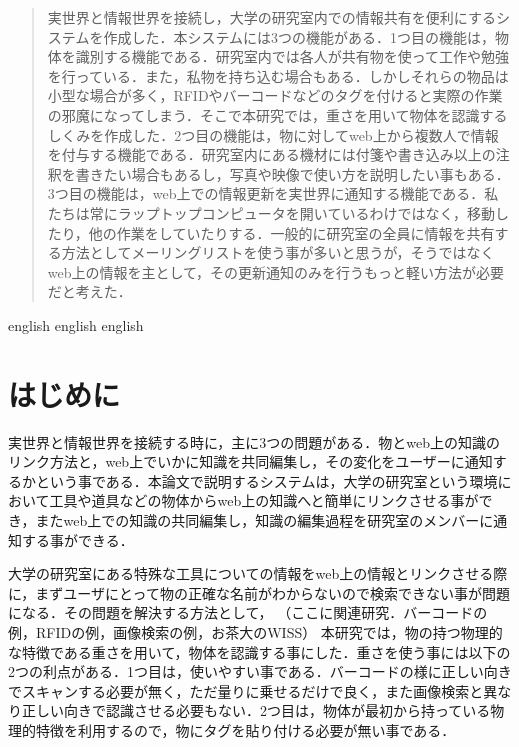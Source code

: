 
\begin{abstract}
実世界と情報世界を接続し，大学の研究室内での情報共有を便利にするシステムを作成した．本システムには3つの機能がある．1つ目の機能は，物体を識別する機能である．研究室内では各人が共有物を使って工作や勉強を行っている．また，私物を持ち込む場合もある．しかしそれらの物品は小型な場合が多く，RFIDやバーコードなどのタグを付けると実際の作業の邪魔になってしまう．そこで本研究では，重さを用いて物体を認識するしくみを作成した．2つ目の機能は，物に対してweb上から複数人で情報を付与する機能である．研究室内にある機材には付箋や書き込み以上の注釈を書きたい場合もあるし，写真や映像で使い方を説明したい事もある．3つ目の機能は，web上での情報更新を実世界に通知する機能である．私たちは常にラップトップコンピュータを開いているわけではなく，移動したり，他の作業をしていたりする．一般的に研究室の全員に情報を共有する方法としてメーリングリストを使う事が多いと思うが，そうではなくweb上の情報を主として，その更新通知のみを行うもっと軽い方法が必要だと考えた．
\end{abstract}

\begin{eabstract}
english english english
\end{eabstract}

\maketitle

\section{はじめに}\label{sec:Introduction}
実世界と情報世界を接続する時に，主に3つの問題がある．物とweb上の知識のリンク方法と，web上でいかに知識を共同編集し，その変化をユーザーに通知するかという事である．本論文で説明するシステムは，大学の研究室という環境において工具や道具などの物体からweb上の知識へと簡単にリンクさせる事ができ，またweb上での知識の共同編集し，知識の編集過程を研究室のメンバーに通知する事ができる．

大学の研究室にある特殊な工具についての情報をweb上の情報とリンクさせる際に，まずユーザにとって物の正確な名前がわからないので検索できない事が問題になる．その問題を解決する方法として，
（ここに関連研究．バーコードの例，RFIDの例，画像検索の例，お茶大のWISS）
本研究では，物の持つ物理的な特徴である重さを用いて，物体を認識する事にした．重さを使う事には以下の2つの利点がある．1つ目は，使いやすい事である．バーコードの様に正しい向きでスキャンする必要が無く，ただ量りに乗せるだけで良く，また画像検索と異なり正しい向きで認識させる必要もない．2つ目は，物体が最初から持っている物理的特徴を利用するので，物にタグを貼り付ける必要が無い事である．

